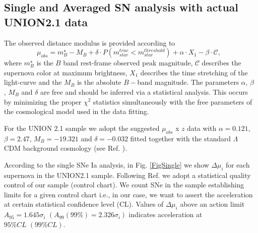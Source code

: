 \documentclass[nofootinbib,twocolumn]{revtex4}
\begin{document}




\subsection{Single and Averaged SN analysis with actual UNION2.1 data}

The observed distance modulus is provided according to
\begin{equation}
\mu_{obs}=m^{\star}_{B}-M_B+\delta \cdot P(m^{true}_{star}< m^{threshold}_{star})+\alpha \cdot X_1 - \beta \cdot \mathcal{C},
\end{equation}
where $m^{\star}_{B}$ is the $B$ band rest-frame observed peak magnitude, $\mathcal{C}$ describes the supernova color at maximum brightness, $X_1$ describes the time stretching of the light-curve and the $M_B$ is the absolute $B-$band magnitude. The parameters $\alpha$, $\beta$, $M_{B}$ and $\delta$ are free and should be inferred via a statistical analysis. This occurs by minimizing the proper $\chi^2$ statistics simultaneously with the free parameters of the cosmological model used in the data fitting. 


For the UNION 2.1 sample we adopt the suggested $\mu_{obs}$ x $z$ data with $\alpha=0.121$, $\beta=2.47$, $M_{B}=-19.321$ and $\delta=-0.032$ fitted together with the standard $\Lambda$CDM background cosmology (see Ref. \cite{Suzuki:2011hu}). 

According to the single SNe Ia analysis, in Fig. \ref{FigSingle} we show $\Delta \mu_i$ for each supernova in the UNION2.1 sample. Following Ref. \cite{Seikel:2007pk} we adopt a statistical quality control of our sample (control chart). We count SNe in the sample establishing limits for a given control chart i.e., in our case, we want to assert the acceleration at certain statistical confidence level (CL). Values of $\Delta \mu_i$ above an action limit $A_{95} = 1.645 \sigma_i \, \, (A_{99} (99\%) = 2.326 \sigma_i)$ indicates acceleration at $95\% CL \,\,(99\% CL)$.


\end{document}

